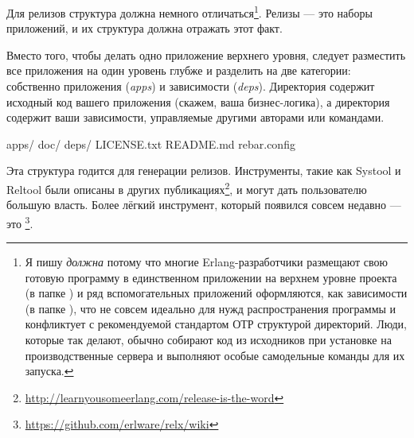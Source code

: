 Для релизов структура должна немного отличаться\footnote{Я пишу \emph{должна} потому что многие Erlang-разработчики размещают свою готовую программу в единственном приложении на верхнем уровне проекта (в папке ) и ряд вспомогательных приложений оформляются, как зависимости (в папке ), что не совсем идеально для нужд распространения программы и конфликтует с рекомендуемой стандартом ОТР структурой директорий. Люди, которые так делают, обычно собирают код из исходников при установке на производственные сервера и выполняют особые самодельные команды для их запуска.}. Релизы --- это наборы приложений, и их структура должна отражать этот факт.

Вместо того, чтобы делать одно приложение верхнего уровня, следует разместить все приложения на один уровень глубже и разделить на две категории: собственно приложения (\emph{apps}) и зависимости (\emph{deps}). Директория  содержит исходный код вашего приложения (скажем, ваша бизнес-логика), а директория  содержит ваши зависимости, управляемые другими авторами или командами.

\begin{VerbatimRaw}
apps/
doc/
deps/
LICENSE.txt
README.md
rebar.config
\end{VerbatimRaw}

Эта структура годится для генерации релизов. Инструменты, такие как Systool и Reltool были описаны в других публикациях\footnote{\href{http://learnyousomeerlang.com/release-is-the-word}{http://learnyousomeerlang.com/release-is-the-word}}, и могут дать пользователю большую власть. Более лёгкий инструмент, который появился совсем недавно --- это \footnote{\href{https://github.com/erlware/relx/wiki}{https://github.com/erlware/relx/wiki}}.

